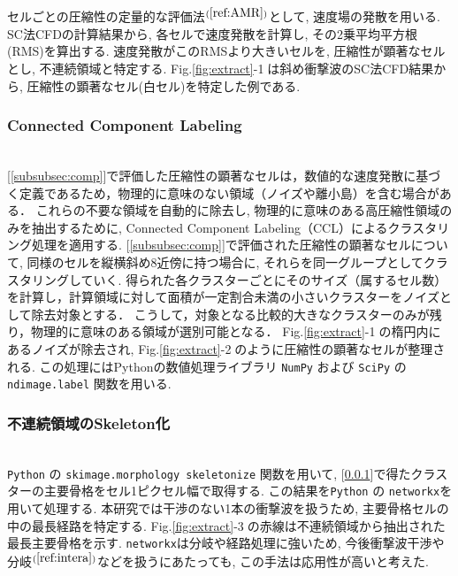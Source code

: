 \documentclass[a4j]{jarticle}
\begin{document}
セルごとの圧縮性の定量的な評価法$^{(\ref{ref:AMR})}$として, 速度場の発散を用いる.
SC法CFDの計算結果から, 各セルで速度発散を計算し, その2乗平均平方根(RMS)を算出する.
速度発散がこのRMSより大きいセルを, 圧縮性が顕著なセルとし, 不連続領域と特定する.
Fig.\ref{fig:extract}-\textcircled{\scriptsize 1}は斜め衝撃波のSC法CFD結果から, 圧縮性の顕著なセル(白セル)を特定した例である.

\subsubsection{Connected Component Labeling}\label{subsubsec:CCL}
\mbox{}\\[-1.0ex]

[\ref{subsubsec:comp}]で評価した圧縮性の顕著なセルは，数値的な速度発散に基づく定義であるため，物理的に意味のない領域（ノイズや離小島）を含む場合がある．
これらの不要な領域を自動的に除去し, 物理的に意味のある高圧縮性領域のみを抽出するために, Connected Component Labeling（CCL）によるクラスタリング処理を適用する.
[\ref{subsubsec:comp}]で評価された圧縮性の顕著なセルについて, 同様のセルを縦横斜め8近傍に持つ場合に, それらを同一グループとしてクラスタリングしていく.
得られた各クラスターごとにそのサイズ（属するセル数）を計算し，計算領域に対して面積が一定割合未満の小さいクラスターをノイズとして除去対象とする．
こうして，対象となる比較的大きなクラスターのみが残り，物理的に意味のある領域が選別可能となる．
Fig.\ref{fig:extract}-\textcircled{\scriptsize 1}の楕円内にあるノイズが除去され, Fig.\ref{fig:extract}-\textcircled{\scriptsize 2}のように圧縮性の顕著なセルが整理される.
この処理にはPythonの数値処理ライブラリ \texttt{NumPy} および \texttt{SciPy} の \texttt{ndimage.label} 関数を用いる.

\subsubsection{不連続領域のSkeleton化} \label{subsubsec:skeleton}
\mbox{}\\[-1.0ex]

\texttt{Python} の \texttt{skimage.morphology skeletonize} 関数を用いて, [\ref{subsubsec:CCL}]で得たクラスターの主要骨格をセル1ピクセル幅で取得する.
この結果を\texttt{Python} の \texttt{networkx}を用いて処理する.
本研究では干渉のない1本の衝撃波を扱うため, 主要骨格セルの中の最長経路を特定する.
Fig.\ref{fig:extract}-\textcircled{\scriptsize 3}の赤線は不連続領域から抽出された最長主要骨格を示す.
\texttt{networkx}は分岐や経路処理に強いため,
今後衝撃波干渉や分岐$^{(\ref{ref:intera})}$などを扱うにあたっても, この手法は応用性が高いと考えた.
\end{document}
